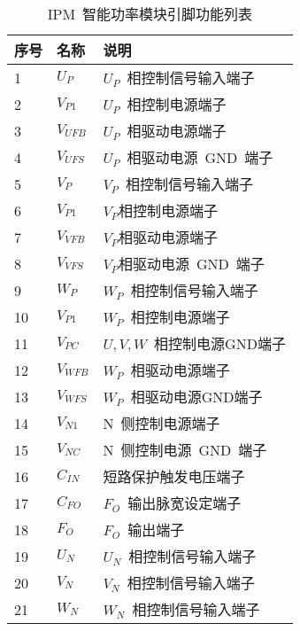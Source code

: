 \documentclass[../Main/thesis.tex]{subfiles}
\begin{document}
\begin{table}[ht]
  \centering
  \caption{IPM~智能功率模块引脚功能列表}
  \label{tab:chap1:IPM_function}
  \begin{tabular}{C{3.6cm}L{1.8cm}L{7.2cm}}
    \toprule
    \textbf{序号} & \textbf{名称} & \textbf{说明}                  \\
                 & $U_P$         & $U_P$~相控制信号输入端子       \\
    2             & $V_{P1}$      & $U_P$~相控制电源端子           \\
    3             & $V_{UFB}$     & $U_P$~相驱动电源端子           \\
    4             & $V_{UFS}$     & $U_P$~相驱动电源~GND~端子      \\
    5             & $V_P$         & $V_P$~相控制信号输入端子       \\
    6             & $V_{P1}$      & $V_P$相控制电源端子            \\
    7             & $V_{VFB}$     & $V_P$相驱动电源端子            \\
    8             & $V_{VFS}$     & $V_P$相驱动电源~GND~端子       \\
    9             & $W_P$         & $W_P$~相控制信号输入端子       \\
    10            & $V_{P1}$      & $W_P$~相控制电源端子           \\
    11            & $V_{PC}$      & $U,V,W$~相控制电源GND端子      \\
    12            & $V_{WFB}$     & $W_P$~相驱动电源端子           \\
    13            & $V_{WFS}$     & $W_P$~相驱动电源GND端子        \\
    14            & $V_{N1}$      & N~侧控制电源端子               \\
    15            & $V_{NC}$      & N~侧控制电源~GND~端子          \\
    16            & $C_{IN}$      & 短路保护触发电压端子           \\
    17            & $C_{FO}$      & $F_O$~输出脉宽设定端子         \\
    18            & $F_O$         & $F_O$~输出端子                 \\
    19            & $U_N$         & $U_N$~相控制信号输入端子       \\
    20            & $V_N$         & $V_N$~相控制信号输入端子       \\
    21            & $W_N$         & $W_N$~相控制信号输入端子       \\

\end{tabular}
\end{table}
\end{document}
